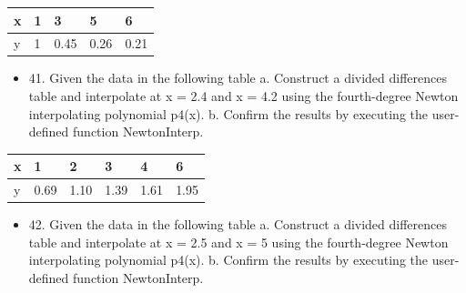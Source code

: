 \documentclass{article}
\begin{document}
\begin{table}[h!]
    \begin{tabular}{l|l|l|l|l}
        \hline
        \multicolumn{1}{|p{30.865313pt}}{\raggedright x} & \multicolumn{1}{|p{30.865313pt}}{\raggedright 1} & \multicolumn{1}{|p{32.370937pt}}{\raggedright 3}    & \multicolumn{1}{|p{30.1125pt}}{\raggedright 5}    & \multicolumn{1}{|p{30.1125pt}|}{\raggedright 6}    \\
        \hline
        \multicolumn{1}{|p{30.865313pt}}{\raggedright y} & \multicolumn{1}{|p{30.865313pt}}{\raggedright 1} & \multicolumn{1}{|p{32.370937pt}}{\raggedright 0.45} & \multicolumn{1}{|p{30.1125pt}}{\raggedright 0.26} & \multicolumn{1}{|p{30.1125pt}|}{\raggedright 0.21} \\
        \hline
    \end{tabular}
\end{table}
\newpage
\begin{itemize}
    \item 41. Given the data in the following table
          \newline  a. Construct a divided differences table and interpolate at x = 2.4
          and x = 4.2 using the fourth-degree Newton interpolating polynomial
          p4(x).    
          \newline   b. Confirm the results by executing the user-defined function
          NewtonInterp.
\end{itemize}

\begin{table}[h!]
    \begin{tabular}{l|l|l|l|l|l}
        \hline
        \multicolumn{1}{|p{30.865313pt}}{\raggedright x} & \multicolumn{1}{|p{30.865313pt}}{\raggedright 1}    & \multicolumn{1}{|p{32.370937pt}}{\raggedright 2}    & \multicolumn{1}{|p{30.1125pt}}{\raggedright 3}    & \multicolumn{1}{|p{30.1125pt}}{\raggedright 4}    & \multicolumn{1}{|p{30.1125pt}|}{\raggedright 6}    \\
        \hline
        \multicolumn{1}{|p{30.865313pt}}{\raggedright y} & \multicolumn{1}{|p{30.865313pt}}{\raggedright 0.69} & \multicolumn{1}{|p{32.370937pt}}{\raggedright 1.10} & \multicolumn{1}{|p{30.1125pt}}{\raggedright 1.39} & \multicolumn{1}{|p{30.1125pt}}{\raggedright 1.61} & \multicolumn{1}{|p{30.1125pt}|}{\raggedright 1.95} \\
        \hline
    \end{tabular}
\end{table}

\begin{itemize}
    \item 42. Given the data in the following table
          \newline   a. Construct a divided differences table and interpolate at x = 2.5
          and x = 5 using the fourth-degree Newton interpolating polynomial
          p4(x).
          \newline   b. Confirm the results by executing the user-defined function
          NewtonInterp.
\end{itemize}
\end{document}
